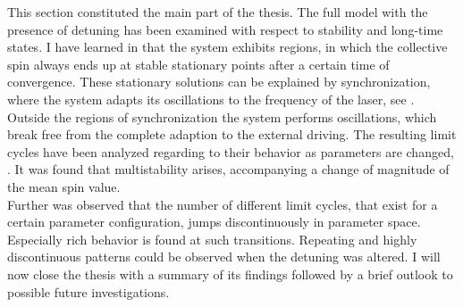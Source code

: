 This section constituted the main part of the thesis. The full model with the presence of detuning has been examined with respect to stability and long-time states. I have learned in  that the system exhibits regions, in which the collective spin always ends up at stable stationary points after a certain time of convergence. These stationary solutions can be explained by synchronization, where the system adapts its oscillations to the frequency of the laser, see . \\Outside the regions of synchronization the system performs oscillations, which break free from the complete adaption to the external driving. The resulting limit cycles have been analyzed regarding to their behavior as parameters are changed, . It was found that multistability arises, accompanying a change of magnitude of the mean spin value. \\Further was observed that the number of different limit cycles, that exist for a certain parameter configuration, jumps discontinuously in parameter space. Especially rich behavior is found at such transitions. Repeating and highly discontinuous patterns could be observed when the detuning was altered. I will now close the thesis with a summary of its findings followed by a brief outlook to possible future investigations.


